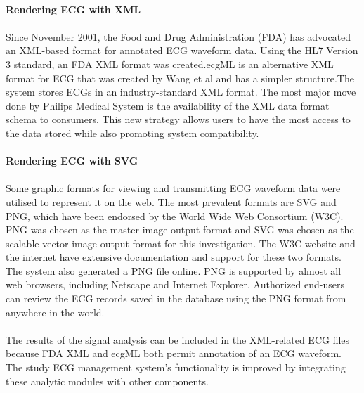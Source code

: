 \documentclass[12pt]{article}
\begin{document}
\paragraph{\textbf{Rendering ECG with XML}}
\paragraph{}Since November 2001, the Food and Drug Administration (FDA) has advocated an XML-based format for annotated ECG waveform data. Using the HL7 Version 3 standard, an FDA XML format was created.ecgML is an alternative XML format for ECG that was created by Wang et al and has a simpler structure.The system stores ECGs in an industry-standard XML format. The most major move done by Philips Medical System is the availability of the XML data format schema to consumers. This new strategy allows users to have the most access to the data stored while also promoting system compatibility.
\paragraph{\textbf{Rendering ECG with SVG}}
\paragraph{}Some graphic formats for viewing and transmitting ECG waveform data were utilised to represent it on the web. The most prevalent formats are SVG and PNG, which have been endorsed by the World Wide Web Consortium (W3C). PNG was chosen as the master image output format and SVG was chosen as the scalable vector image output format for this investigation. The W3C website and the internet have extensive documentation and support for these two formats.\\The system also generated a PNG file online. PNG is supported by almost all web browsers, including Netscape and Internet Explorer. Authorized end-users can review the ECG records saved in the database using the PNG format from anywhere in the world.
\paragraph{}The results of the signal analysis can be included in the XML-related ECG files because FDA XML and ecgML both permit annotation of an ECG waveform. The study ECG management system's functionality is improved by integrating these analytic modules with other components.
\end{document}
